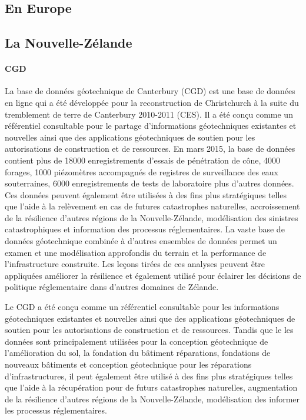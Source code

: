         \subsection{En Europe}
        \lipsum[1]
        \subsection{La Nouvelle-Zélande}
        \paragraph{CGD}
        La base de données géotechnique de Canterbury (CGD) est une base de données en ligne qui a été développée pour
        la reconstruction de Christchurch à la suite du tremblement de terre de Canterbury 2010-2011 (CES). Il
        a été conçu comme un référentiel consultable pour le partage d'informations géotechniques existantes et nouvelles
        ainsi que des applications géotechniques de soutien pour les autorisations de construction et de ressources. En mars
        2015, la base de données contient plus de 18000 enregistrements d'essais de pénétration de cône, 4000 forages, 1000
        piézomètres accompagnés de registres de surveillance des eaux souterraines, 6000 enregistrements de tests de laboratoire
        plus d'autres données. Ces données peuvent également être utilisées à des fins plus stratégiques telles que l'aide à la
        relèvement en cas de futures catastrophes naturelles, accroissement de la résilience d'autres régions de la Nouvelle-Zélande,
        modélisation des sinistres catastrophiques et information des processus réglementaires. La vaste base de données géotechnique
        combinée à d'autres ensembles de données permet un examen et une modélisation approfondis du terrain
        et la performance de l'infrastructure construite. Les leçons tirées de ces analyses peuvent être appliquées
        améliorer la résilience et également utilisé pour éclairer les décisions de politique réglementaire dans d'autres domaines de
        Zélande.
        \par
        Le CGD a été conçu comme un référentiel consultable pour les informations géotechniques existantes et nouvelles
        ainsi que des applications géotechniques de soutien pour les autorisations de construction et de ressources. Tandis que le
        les données sont principalement utilisées pour la conception géotechnique de l'amélioration du sol, la fondation du bâtiment
        réparations, fondations de nouveaux bâtiments et conception géotechnique pour les réparations d'infrastructures, il peut
        également être utilisé à des fins plus stratégiques telles que l'aide à la récupération pour de futurs
        catastrophes naturelles, augmentation de la résilience d'autres régions de la Nouvelle-Zélande, modélisation des
        informer les processus réglementaires.
        \cite{cgd}

